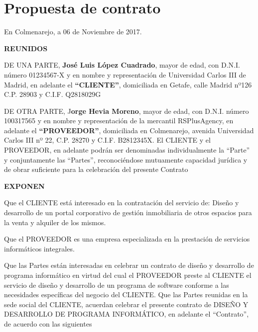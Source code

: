 \chapter{Propuesta de contrato}
\clearpage

En Colmenarejo, a 06 de Noviembre de 2017.
\begin{center}
  \textbf{REUNIDOS}
\end{center}

\par DE UNA  PARTE, \textbf{José Luis López Cuadrado}, mayor de edad, con D.N.I. número 01234567-X y en nombre y representación de Universidad Carlos III de Madrid, en adelante el \textbf{“CLIENTE”}, domiciliada en Getafe, calle Madrid nº126 C.P. 28903  y C.I.F. Q2818029G
\par DE OTRA  PARTE, J\textbf{orge Hevia Moreno}, mayor de edad, con D.N.I. número 100317565 y en nombre y representación de la mercantil RSPlusAgency, en adelante el \textbf{“PROVEEDOR”}, domiciliada en Colmenarejo, avenida Universidad Carlos III nº 22, C.P. 28270  y C.I.F. B2812345X.
El CLIENTE y el PROVEEDOR, en adelante podrán ser denominadas individualmente la “Parte” y conjuntamente las “Partes”, reconociéndose mutuamente capacidad jurídica y de obrar suficiente para la celebración del presente Contrato

\begin{center}
  \textbf{EXPONEN}
\end{center}

\begin{description} [style=multiline, leftmargin=3cm]
  \item[PRIMERO:] Que el CLIENTE está interesado en la contratación del servicio de:
  Diseño y desarrollo de un portal corporativo de gestión inmobiliaria de otros espacios para la venta y alquiler de los mismos.
  \item[SEGUNDO:] Que el PROVEEDOR es una empresa especializada en la prestación de servicios informáticos integrales.
  \item[TERCERO:] Que las Partes están interesadas en celebrar un contrato de diseño y desarrollo de programa informático en virtud del cual el PROVEEDOR preste al CLIENTE el servicio de diseño y desarrollo de un programa de software conforme a las necesidades específicas del negocio del CLIENTE.
  Que las Partes reunidas en la sede social del CLIENTE, acuerdan celebrar el presente contrato de DISEÑO Y DESARROLLO DE PROGRAMA INFORMÁTICO, en adelante el “Contrato”, de acuerdo con las siguientes
\end{description}

